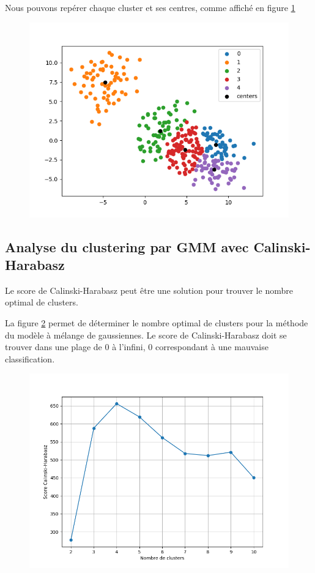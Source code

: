 \documentclass[french,a4paper,18pt]{article}
\begin{document}
Nous pouvons repérer chaque cluster et ses centres, comme affiché en figure \ref{fig:gmm_clusters_centers}

\begin{figure}[h!]
    \centering
    \includegraphics[scale=0.4]{../images/gmm_clusters_centers.png}
    \caption{}\label{fig:gmm_clusters_centers}
\end{figure}

\subsection{Analyse du clustering par GMM avec Calinski-Harabasz}

Le score de Calinski-Harabasz peut être une solution pour trouver le nombre optimal de clusters.

La figure \ref{fig:gmm_ch_score} permet de déterminer le nombre optimal de clusters pour la méthode du modèle à mélange de gaussiennes.
Le score de Calinski-Harabasz doit se trouver dans une plage de 0 à l'infini, 0 correspondant à une mauvaise classification.

\begin{figure}[h!]
    \centering
    \includegraphics[scale=0.4]{../images/calinski_harabasz_scores_gmm.png}
    \caption{}\label{fig:gmm_ch_score}
\end{figure}
\end{document}
